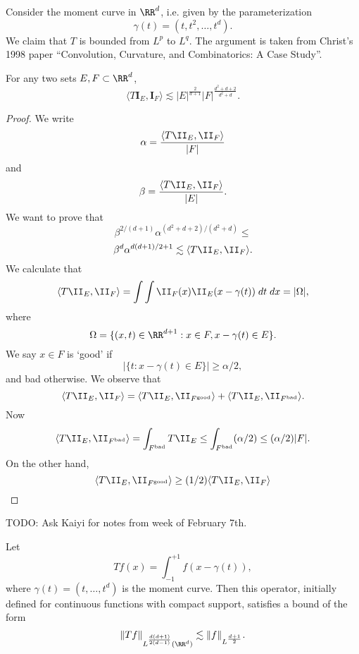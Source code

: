 Consider the moment curve in $\RR^d$, i.e. given by the parameterization
%
\[ \gamma(t) = (t,t^2,\dots,t^d). \]
%
We claim that $T$ is bounded from $L^p$ to $L^q$. The argument is taken from Christ's 1998 paper ``Convolution, Curvature, and Combinatorics: A Case Study''.

\begin{theorem}[Christ (1998)]
    For any two sets $E,F \subset \RR^d$,
    \[ \langle T \mathbf{I}_E, \mathbf{I}_F \rangle \lesssim |E|^{\frac{2}{d+1}} |F|^{\frac{d^2 + d + 2}{d^2 + d}}. \]
\end{theorem}
\begin{proof}
    We write
    \begin{align*}
        \alpha = \frac{\langle T \II_E, \II_F \rangle}{|F|}
    \end{align*}
    and
    \[ \beta = \frac{\langle T \II_E, \II_F \rangle}{|E|}. \]
    We want to prove that
    \[ \beta^{2/(d+1)} \alpha^{(d^2 + d + 2) / (d^2 + d)} \leq \]
    \[ \beta^d \alpha^{d(d+1)/2 + 1} \lesssim \langle T \II_E, \II_F \rangle. \]
    We calculate that
    \[ \langle T \II_E, \II_F \rangle = \int \int \II_F(x) \II_E(x - \gamma(t))\; dt\; dx = |\Omega|, \]
    where
    \[ \Omega = \{ (x,t) \in \RR^{d+1}: x \in F, x - \gamma(t) \in E \}. \]
    We say $x \in F$ is `good' if
    \[ |\{ t : x - \gamma(t) \in E \}| \geq \alpha / 2, \]
    and bad otherwise. We observe that
    \[ \langle T\II_E, \II_F \rangle = \langle T \II_E, \II_{F^{\text{good}}} \rangle + \langle T \II_E, \II_{F^{\text{bad}}} \rangle. \]
    Now
    \[ \langle T \II_E, \II_{F^{\text{bad}}} \rangle = \int_{F^{\text{bad}}} T \II_E \leq \int_{F^{\text{bad}}} (\alpha / 2) \leq (\alpha / 2) |F|. \]
    On the other hand,
    \[ \langle T \II_E, \II_{F^{\text{good}}} \rangle \geq (1/2) \langle T \II_E, \II_F \rangle \]
\end{proof}

TODO: Ask Kaiyi for notes from week of February 7th.

\begin{theorem}
    Let
    \[ Tf(x) = \int_{-1}^{+1} f(x - \gamma(t)), \]
    where $\gamma(t) = (t,\dots,t^d)$ is the moment curve. Then this operator, initially defined for continuous functions with compact support, satisfies a bound of the form
    \[ \| Tf \|_{L^{\frac{d(d+1)}{2(d-1)}}(\RR^d)} \lesssim \| f \|_{L^{\frac{d+1}{2}}}. \]
\end{theorem}

